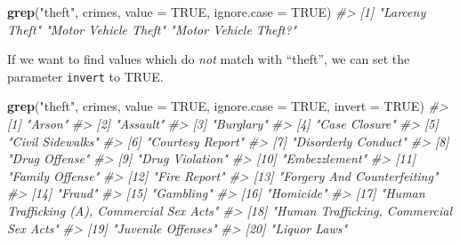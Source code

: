 \documentclass[
  12pt,
]{book}
\newenvironment{Shaded}{\begin{snugshade}}{\end{snugshade}}
\newcommand{\CommentTok}[1]{\textcolor[rgb]{0.37,0.37,0.37}{\textit{#1}}}
\newcommand{\DataTypeTok}[1]{\textcolor[rgb]{0.27,0.27,0.27}{#1}}
\newcommand{\KeywordTok}[1]{\textcolor[rgb]{0.27,0.27,0.27}{\textbf{#1}}}
\newcommand{\NormalTok}[1]{#1}
\newcommand{\OtherTok}[1]{\textcolor[rgb]{0.37,0.37,0.37}{#1}}
\newcommand{\StringTok}[1]{\textcolor[rgb]{0.5,0.5,0.5}{#1}}
\begin{document}
\begin{Shaded}
\begin{Highlighting}[]
\KeywordTok{grep}\NormalTok{(}\StringTok{"theft"}\NormalTok{, crimes, }\DataTypeTok{value =} \OtherTok{TRUE}\NormalTok{, }\DataTypeTok{ignore.case =} \OtherTok{TRUE}\NormalTok{)}
\CommentTok{\#\textgreater{} [1] "Larceny Theft"        "Motor Vehicle Theft"  "Motor Vehicle Theft?"}
\end{Highlighting}
\end{Shaded}

If we want to find values which do \emph{not} match with ``theft'', we can set the parameter \texttt{invert} to TRUE.

\begin{Shaded}
\begin{Highlighting}[]
\KeywordTok{grep}\NormalTok{(}\StringTok{"theft"}\NormalTok{, crimes, }\DataTypeTok{value =} \OtherTok{TRUE}\NormalTok{, }\DataTypeTok{ignore.case =} \OtherTok{TRUE}\NormalTok{, }\DataTypeTok{invert =} \OtherTok{TRUE}\NormalTok{)}
\CommentTok{\#\textgreater{}  [1] "Arson"                                     }
\CommentTok{\#\textgreater{}  [2] "Assault"                                   }
\CommentTok{\#\textgreater{}  [3] "Burglary"                                  }
\CommentTok{\#\textgreater{}  [4] "Case Closure"                              }
\CommentTok{\#\textgreater{}  [5] "Civil Sidewalks"                           }
\CommentTok{\#\textgreater{}  [6] "Courtesy Report"                           }
\CommentTok{\#\textgreater{}  [7] "Disorderly Conduct"                        }
\CommentTok{\#\textgreater{}  [8] "Drug Offense"                              }
\CommentTok{\#\textgreater{}  [9] "Drug Violation"                            }
\CommentTok{\#\textgreater{} [10] "Embezzlement"                              }
\CommentTok{\#\textgreater{} [11] "Family Offense"                            }
\CommentTok{\#\textgreater{} [12] "Fire Report"                               }
\CommentTok{\#\textgreater{} [13] "Forgery And Counterfeiting"                }
\CommentTok{\#\textgreater{} [14] "Fraud"                                     }
\CommentTok{\#\textgreater{} [15] "Gambling"                                  }
\CommentTok{\#\textgreater{} [16] "Homicide"                                  }
\CommentTok{\#\textgreater{} [17] "Human Trafficking (A), Commercial Sex Acts"}
\CommentTok{\#\textgreater{} [18] "Human Trafficking, Commercial Sex Acts"    }
\CommentTok{\#\textgreater{} [19] "Juvenile Offenses"                         }
\CommentTok{\#\textgreater{} [20] "Liquor Laws"                               }

\end{Highlighting}
\end{Shaded}
\end{document}
